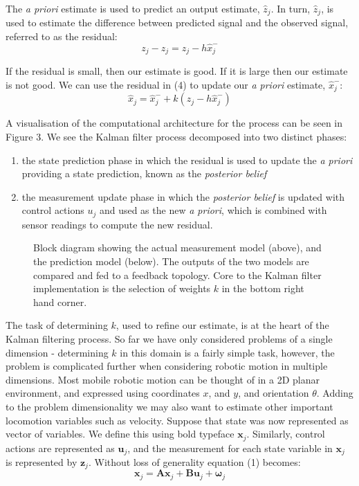 \documentclass[a4paper]{article}
\begin{document}
The \textit{a priori} estimate is used to predict an output estimate,  $\hat{z}_j$. In turn, $\hat{z}_j$, is used to estimate the difference between predicted signal and the observed signal, referred to as the residual:
\begin{equation}
z_j - \hat{z}_j = z_j - h \hat{x}^-_j
\end{equation}

If the residual is small, then our estimate is good. If it is large then our estimate is not good. We can use the residual in (4) to update our \textit{a priori} estimate, $\hat{x}^-_j$:
\begin{equation}
\hat{x}_j = \hat{x}^-_j + k (z_j - h \hat{x}^-_j)
\end{equation}

A visualisation of the computational architecture for the process can be seen in Figure 3. We see the Kalman filter process decomposed into two distinct phases:
\begin{enumerate}
\item the state prediction phase in which the residual is used to update the \textit{a priori} providing a state prediction, known as the \textit{posterior belief}
\item the measurement update phase in which the \textit{posterior belief} is updated with control actions $u_j$ and used as the new \textit{a priori}, which is combined with sensor readings to compute the new residual.
\end{enumerate}

\begin{figure}[h]
\centering

\caption{Block diagram showing the actual measurement model (above), and the prediction model (below). The outputs of the two models are compared and fed to a feedback topology. Core to the Kalman filter implementation is the selection of weights $k$ in the bottom right hand corner.}
\end{figure}

The task of determining $k$, used to refine our estimate, is at the heart of the Kalman filtering process. So far we have only considered problems of a single dimension - determining $k$ in this domain is a fairly simple task, however, the problem is complicated further when considering robotic motion in multiple dimensions. Most mobile robotic motion can be thought of in a 2D planar environment, and expressed using coordinates $x$, and $y$, and orientation $\theta$. Adding to the problem dimensionality we may also want to estimate other important locomotion variables such as velocity. Suppose that state was now represented as vector of variables. We define this using bold typeface $\mathbf{x}_j$. Similarly, control actions are represented as $\mathbf{u}_j$, and the measurement for each state variable in $\mathbf{x}_j$ is represented by $\mathbf{z}_j$. Without loss of generality equation (1) becomes:
\begin{equation}
\mathbf{x}_j = \mathbf{A} \mathbf{x}_j + \mathbf{B} \mathbf{u}_j + \boldsymbol{\omega}_j
\end{equation}
\end{document}
